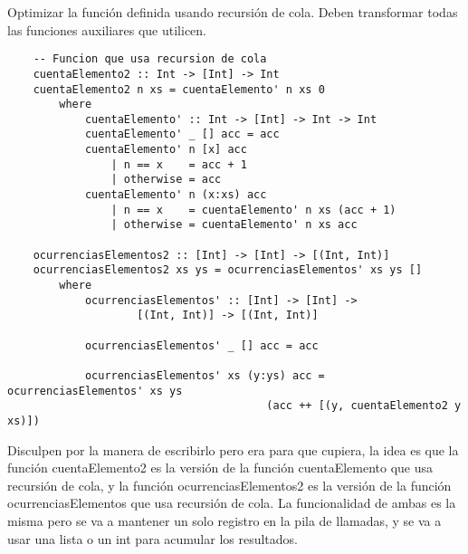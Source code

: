 Optimizar la función definida usando recursión de cola. 
Deben transformar todas las funciones auxiliares que utilicen.

\begin{verbatim}
    -- Funcion que usa recursion de cola
    cuentaElemento2 :: Int -> [Int] -> Int
    cuentaElemento2 n xs = cuentaElemento' n xs 0
        where
            cuentaElemento' :: Int -> [Int] -> Int -> Int
            cuentaElemento' _ [] acc = acc
            cuentaElemento' n [x] acc
                | n == x    = acc + 1
                | otherwise = acc
            cuentaElemento' n (x:xs) acc
                | n == x    = cuentaElemento' n xs (acc + 1)
                | otherwise = cuentaElemento' n xs acc 

    ocurrenciasElementos2 :: [Int] -> [Int] -> [(Int, Int)]
    ocurrenciasElementos2 xs ys = ocurrenciasElementos' xs ys []
        where
            ocurrenciasElementos' :: [Int] -> [Int] -> 
                    [(Int, Int)] -> [(Int, Int)]
                        
            ocurrenciasElementos' _ [] acc = acc

            ocurrenciasElementos' xs (y:ys) acc = ocurrenciasElementos' xs ys 
                                        (acc ++ [(y, cuentaElemento2 y xs)])
\end{verbatim}

Disculpen por la manera de escribirlo pero era para que cupiera,
la idea es que la función cuentaElemento2 es la versión de la
función cuentaElemento que usa recursión de cola, y la función
ocurrenciasElementos2 es la versión de la función ocurrenciasElementos
que usa recursión de cola. La funcionalidad de ambas es la misma pero
se va a mantener un solo registro en la pila de llamadas, y se va a 
usar una lista o un int para acumular los resultados.

\vspace{.3cm}